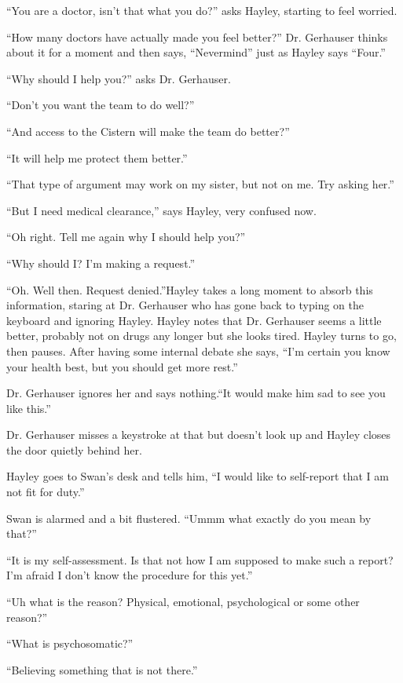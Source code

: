 ``You are a doctor, isn't that what you do?'' asks Hayley, starting to feel worried.

``How many doctors have actually made you feel better?''  Dr. Gerhauser thinks about it for a moment and then says, ``Nevermind'' just as Hayley says ``Four.''

``Why should I help you?'' asks Dr. Gerhauser.

``Don't you want the team to do well?''

``And access to the Cistern will make the team do better?''

``It will help me protect them better.''

``That type of argument may work on my sister, but not on me.  Try asking her.''

``But I need medical clearance,'' says Hayley, very confused now.

``Oh right.  Tell me again why I should help you?''

``Why should I?  I'm making a request.''

``Oh.  Well then.  Request denied.''Hayley takes a long moment to absorb this information, staring at Dr. Gerhauser who has gone back to typing on the keyboard and ignoring Hayley.  Hayley notes that Dr. Gerhauser seems a little better, probably not on drugs any longer but she looks tired.  Hayley turns to go, then pauses.  After having some internal debate she says, ``I'm certain you know your health best, but you should get more rest.''

Dr. Gerhauser ignores her and says nothing.``It would make him sad to see you like this.''

Dr. Gerhauser misses a keystroke at that but doesn't look up and Hayley closes the door quietly behind her.



Hayley goes to Swan's desk and tells him, ``I would like to self-report that I am not fit for duty.''

Swan is alarmed and a bit flustered.  ``Ummm what exactly do you mean by that?''

``It is my self-assessment.  Is that not how I am supposed to make such a report?  I'm afraid I don't know the procedure for this yet.''

``Uh what is the reason?  Physical, emotional, psychological or some other reason?''

``What is psychosomatic?''

``Believing something that is not there.''

